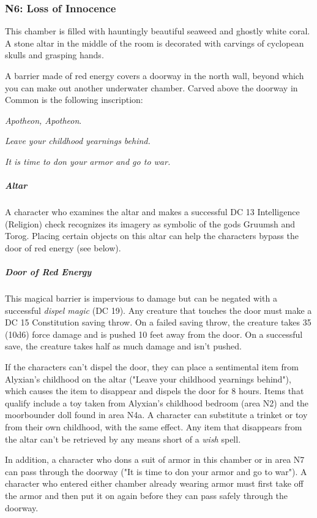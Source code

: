 \documentclass[10pt,a4paper,twoside,fancy,bg=print,twocolumn,openany,nodeprecatedcode]{dndbook}
\begin{document}
\subsubsection{N6: Loss of Innocence}
\begin{DndReadAloud}{}
This chamber is filled with hauntingly beautiful seaweed and ghostly white coral. A stone altar in the middle of the room is decorated with carvings of cyclopean skulls and grasping hands.

A barrier made of red energy covers a doorway in the north wall, beyond which you can make out another underwater chamber. Carved above the doorway in Common is the following inscription:

\textit{Apotheon, Apotheon}.

\textit{Leave your childhood yearnings behind.}

\textit{It is time to don your armor and go to war.}

\end{DndReadAloud}

\subparagraph{Altar}
A character who examines the altar and makes a successful DC 13 Intelligence (Religion) check recognizes its imagery as symbolic of the gods Gruumsh and Torog. Placing certain objects on this altar can help the characters bypass the door of red energy (see below).

\subparagraph{Door of Red Energy}
This magical barrier is impervious to damage but can be negated with a successful \textit{dispel magic} (DC 19). Any creature that touches the door must make a DC 15 Constitution saving throw. On a failed saving throw, the creature takes 35 (10d6) force damage and is pushed 10 feet away from the door. On a successful save, the creature takes half as much damage and isn't pushed.

If the characters can't dispel the door, they can place a sentimental item from Alyxian's childhood on the altar ("Leave your childhood yearnings behind"), which causes the item to disappear and dispels the door for 8 hours. Items that qualify include a toy taken from Alyxian's childhood bedroom (area N2) and the moorbounder doll found in area N4a. A character can substitute a trinket or toy from their own childhood, with the same effect. Any item that disappears from the altar can't be retrieved by any means short of a \textit{wish} spell.

In addition, a character who dons a suit of armor in this chamber or in area N7 can pass through the doorway ("It is time to don your armor and go to war"). A character who entered either chamber already wearing armor must first take off the armor and then put it on again before they can pass safely through the doorway.
\end{document}
